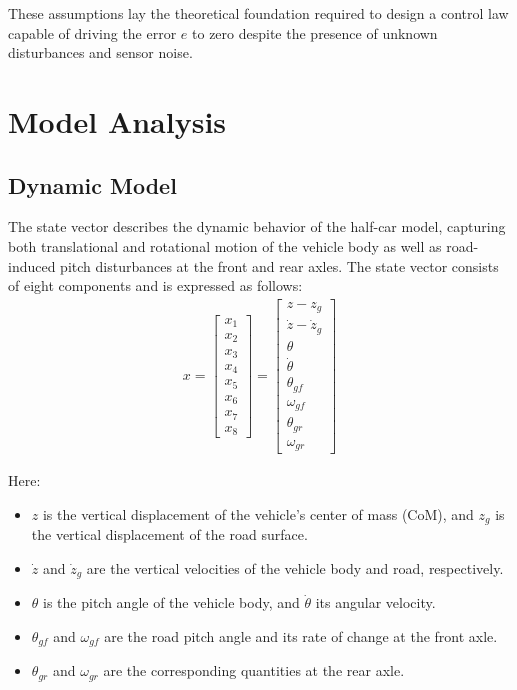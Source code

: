 \documentclass[]{report}
\begin{document}
	These assumptions lay the theoretical foundation required to design a control law capable of driving the error $e$ to zero despite the presence of unknown disturbances and sensor noise.
	
	\section{Model Analysis}
	\subsection{Dynamic Model}
	
	The state vector describes the dynamic behavior of the half-car model, capturing both translational and rotational motion of the vehicle body as well as road-induced pitch disturbances at the front and rear axles. The state vector consists of eight components and is expressed as follows:
	\begin{align}
		x = \begin{bmatrix}
			x_1 \\ x_2 \\ x_3 \\ x_4 \\ x_5 \\ x_6 \\ x_7 \\ x_8
		\end{bmatrix} =
		\begin{bmatrix}
			z - z_g \\
			\dot{z} - \dot{z}_g \\
			\theta \\
			\dot{\theta} \\
			\theta_{gf} \\
			\omega_{gf} \\
			\theta_{gr} \\
			\omega_{gr}
		\end{bmatrix}
	\end{align}
	
	Here:
	\begin{itemize}
		\item $z$ is the vertical displacement of the vehicle’s center of mass (CoM), and $z_g$ is the vertical displacement of the road surface.
		\item $\dot{z}$ and $\dot{z}_g$ are the vertical velocities of the vehicle body and road, respectively.
		\item $\theta$ is the pitch angle of the vehicle body, and $\dot{\theta}$ its angular velocity.
		\item $\theta_{gf}$ and $\omega_{gf}$ are the road pitch angle and its rate of change at the front axle.
		\item $\theta_{gr}$ and $\omega_{gr}$ are the corresponding quantities at the rear axle.
	\end{itemize}
	
\end{document}
